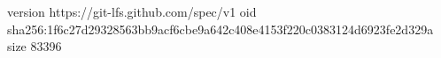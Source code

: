 version https://git-lfs.github.com/spec/v1
oid sha256:1f6c27d29328563bb9acf6cbe9a642c408e4153f220c0383124d6923fe2d329a
size 83396

